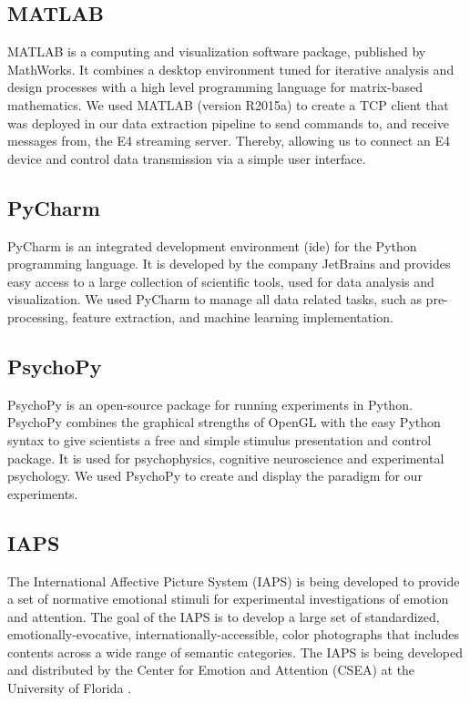 \subsection{MATLAB}
MATLAB is a computing and visualization software package, published by MathWorks. It combines a desktop environment tuned for iterative analysis and design processes with a high level programming language for matrix-based mathematics. We used MATLAB (version R2015a) to create a TCP client that was deployed in our data extraction pipeline to send commands to, and receive messages from, the E4 streaming server. Thereby, allowing us to connect an E4 device and control data transmission via a simple user interface.
\subsection{PyCharm}
PyCharm is an integrated development environment (\gls{ide}) for the Python programming language. It is developed by the company JetBrains and provides easy access to a large collection of scientific tools, used for data analysis and visualization. We used PyCharm to manage all data related tasks, such as pre-processing, feature extraction, and machine learning implementation. 

\subsection{PsychoPy}
PsychoPy is an open-source package for running experiments in Python. PsychoPy combines the graphical strengths of OpenGL with the easy Python syntax to give scientists a free and simple stimulus presentation and control package. It is used for psychophysics, cognitive neuroscience and experimental psychology. We used PsychoPy to create and display the paradigm for our experiments. 

\subsection{IAPS}
The International Affective Picture System (IAPS) is being developed to provide a set of normative emotional stimuli for experimental investigations of emotion and attention. The goal of the IAPS is to develop a large set of standardized, emotionally-evocative, internationally-accessible, color photographs that includes contents across a wide range of semantic categories. The IAPS is being developed and distributed by the Center for Emotion and Attention (CSEA) at the University of Florida \cite{Lang2008}.
